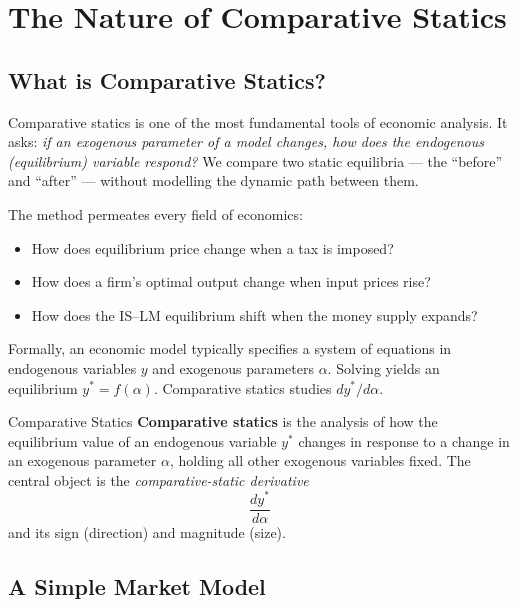 \documentclass[12pt, a4paper]{article}
\theoremstyle{definition}
\newcommand{\ddd}[2]{\dfrac{d#1}{d#2}}
\begin{document}
\newpage
\tableofcontents
\newpage

\section{The Nature of Comparative Statics}

\subsection{What is Comparative Statics?}

Comparative statics is one of the most fundamental tools of economic analysis.
It asks: \textit{if an exogenous parameter of a model changes, how does the
endogenous (equilibrium) variable respond?}  We compare two static equilibria
--- the ``before'' and ``after'' --- without modelling the dynamic path between
them.
\medskip

The method permeates every field of economics:
\begin{itemize}
  \item How does equilibrium price change when a tax is imposed?
  \item How does a firm's optimal output change when input prices rise?
  \item How does the IS--LM equilibrium shift when the money supply expands?
\end{itemize}

Formally, an economic model typically specifies a system of equations in
endogenous variables $y$ and exogenous parameters $\alpha$.  Solving yields
an equilibrium $y^* = f(\alpha)$.  Comparative statics studies $dy^*/d\alpha$.

\begin{defbox}{Comparative Statics}
\textbf{Comparative statics} is the analysis of how the equilibrium value of
an endogenous variable $y^*$ changes in response to a change in an exogenous
parameter $\alpha$, holding all other exogenous variables fixed.  The central
object is the \emph{comparative-static derivative}
\[
  \ddd{y^*}{\alpha}
\]
and its sign (direction) and magnitude (size).
\end{defbox}

\subsection{A Simple Market Model}
\end{document}
